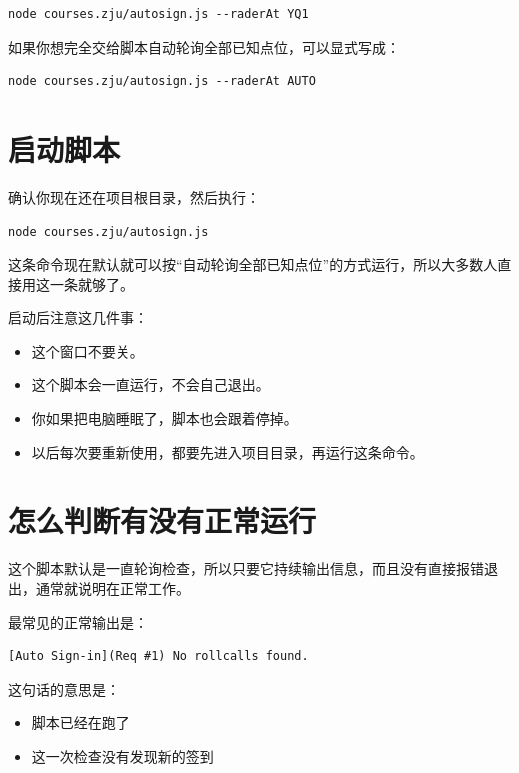 \documentclass[UTF8,12pt]{ctexart}
\begin{document}
\begin{verbatim}
node courses.zju/autosign.js --raderAt YQ1
\end{verbatim}

\noindent 如果你想完全交给脚本自动轮询全部已知点位，可以显式写成：

\begin{verbatim}
node courses.zju/autosign.js --raderAt AUTO
\end{verbatim}

\section{启动脚本}

\noindent 确认你现在还在项目根目录，然后执行：

\begin{verbatim}
node courses.zju/autosign.js
\end{verbatim}

\noindent 这条命令现在默认就可以按“自动轮询全部已知点位”的方式运行，所以大多数人直接用这一条就够了。

\noindent 启动后注意这几件事：

\begin{itemize}
  \item 这个窗口不要关。
  \item 这个脚本会一直运行，不会自己退出。
  \item 你如果把电脑睡眠了，脚本也会跟着停掉。
  \item 以后每次要重新使用，都要先进入项目目录，再运行这条命令。
\end{itemize}

\section{怎么判断有没有正常运行}

\noindent 这个脚本默认是一直轮询检查，所以只要它持续输出信息，而且没有直接报错退出，通常就说明在正常工作。

\noindent 最常见的正常输出是：

\begin{verbatim}
[Auto Sign-in](Req #1) No rollcalls found.
\end{verbatim}

\noindent 这句话的意思是：

\begin{itemize}
  \item 脚本已经在跑了
  \item 这一次检查没有发现新的签到
\end{itemize}
\end{document}
